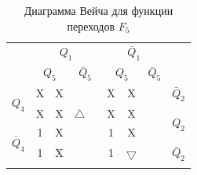 \documentclass[a4paper,14pt]{article}
\begin{document}
\begin{table}[H]
	\begin{center}
		\caption{\label{tab:F5_tab} Диаграмма Вейча для функции переходов $F_5$ }
\begin{tabular}{cccccccccc}
	                                                  &                                                \multicolumn{4}{c}{$Q_1$}                                                 &                                              \multicolumn{4}{c}{$\bar{Q}_1$}                                               &                        \\
	                                                  &                \multicolumn{2}{c}{$Q_5$}                 &                \multicolumn{2}{c}{$\bar{Q}_5$}                &                    \multicolumn{2}{c}{$Q_5$}                     &             \multicolumn{2}{c}{$\bar{Q}_5$}             &                        \\ \cline{2-9}
	   \multicolumn{1}{c|}{\multirow{2}{*}{$Q_4$}}    &     \multicolumn{1}{c|}{X}      & \multicolumn{1}{c|}{X} &         \multicolumn{1}{c|}{}         & \multicolumn{1}{c|}{} & \multicolumn{1}{c|}{X} &         \multicolumn{1}{c|}{X}          & \multicolumn{1}{c|}{} &      \multicolumn{1}{c|}{}      &      $\bar{Q}_2$       \\ \cline{2-9}
	              \multicolumn{1}{c|}{}               &     \multicolumn{1}{c|}{X}      & \multicolumn{1}{c|}{X} & \multicolumn{1}{c|}{$\bigtriangleup$} & \multicolumn{1}{c|}{} & \multicolumn{1}{c|}{X} &         \multicolumn{1}{c|}{X}          & \multicolumn{1}{c|}{} &      \multicolumn{1}{c|}{}      & \multirow{2}{*}{$Q_2$} \\ \cline{2-9}
	\multicolumn{1}{c|}{\multirow{2}{*}{$\bar{Q}_4$}} &     \multicolumn{1}{c|}{1}      & \multicolumn{1}{c|}{X} &         \multicolumn{1}{c|}{}         & \multicolumn{1}{c|}{} & \multicolumn{1}{c|}{1} &         \multicolumn{1}{c|}{X}          & \multicolumn{1}{c|}{} &      \multicolumn{1}{c|}{}      &                        \\ \cline{2-9}
	              \multicolumn{1}{c|}{}               &     \multicolumn{1}{c|}{1}      & \multicolumn{1}{c|}{X} &         \multicolumn{1}{c|}{}         & \multicolumn{1}{c|}{} & \multicolumn{1}{c|}{1} & \multicolumn{1}{c|}{$\bigtriangledown$} & \multicolumn{1}{c|}{} &      \multicolumn{1}{c|}{}      &      $\bar{Q}_2$       \\ \cline{2-9}
	                                                  &                                 &                      \multicolumn{2}{c}{}                      &              \multicolumn{2}{c}{}              &                      \multicolumn{2}{c}{}                       &                                 &                        \\

\end{tabular}
\end{center}
\end{table}
\end{document}
